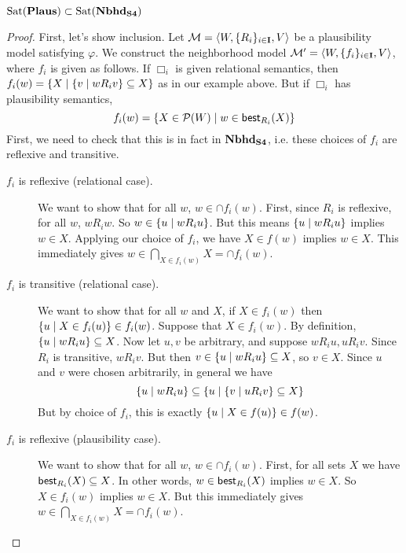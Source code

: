 \documentclass[letterpaper]{article}
\begin{document}

\begin{proposition}
    $\mathrm{Sat}( \textrm{\textbf{Plaus}} ) \subset \mathrm{Sat}( \textrm{\textbf{Nbhd}}_\textrm{\textbf{S4}} )$
\end{proposition}
\begin{proof}
    First, let's show inclusion.  Let $\mathcal{M} = \langle W, \{ R_i \}_{i \in \textbf{I}}, V \rangle$ be a plausibility model satisfying $\varphi$.  We construct the neighborhood model $\mathcal{M}' = \langle W, \{ f_i \}_{i \in \textbf{I}}, V \rangle$, where $f_i$ is given as follows.  If $\Box_i$ is given relational semantics, then $f_i(w) = \{ X \mid \{ v \mid w{R_i}v  \}\subseteq X \}$ as in our example above.  But if $\Box_i$ has plausibility semantics,
    \[
        f_i(w) = \{ X \in \mathcal{P}(W) \mid w \in \mathsf{best}_{R_i}(X) \}
    \]
    First, we need to check that this is in fact in $\textrm{\textbf{Nbhd}}_\textrm{\textbf{S4}}$, i.e. these choices of $f_i$ are reflexive and transitive.
    \begin{description}
        \item[$f_i$ is reflexive (relational case).]
        We want to show that for all $w$, $w \in \cap f_i(w)$.  First, since $R_i$ is reflexive, for all $w$, $w{R_i}w$.  So $w \in \{ u \mid w{R_i}u \}$.  But this means $\{ u \mid w{R_i}u \}$ implies $w \in X$.  Applying our choice of $f_i$, we have $X \in f(w)$ implies $w \in X$.  This immediately gives $w \in \bigcap_{X \in f_i(w)} X = \cap f_i(w)$.

        \item[$f_i$ is transitive (relational case).]
        We want to show that for all $w$ and $X$, if $X \in f_i(w)$ then $\{ u \mid X \in f_i(u) \} \in f_i(w)$.  Suppose that $X \in f_i(w)$.  By definition, $\{ u \mid w{R_i}u \} \subseteq X$.  Now let $u, v$ be arbitrary, and suppose $w{R_i}u, u{R_i}v$.  Since $R_i$ is transitive, $w{R_i}v$.  But then $v \in \{ u \mid w{R_i}u \} \subseteq X$, so $v \in X$.  Since $u$ and $v$ were chosen arbitrarily, in general we have
        \[
            \{ u \mid w{R_i}u \} \subseteq \{ u \mid \{ v \mid u{R_i}v \} \subseteq X \}
        \]
        But by choice of $f_i$, this is exactly $\{ u \mid X \in f(u) \} \in f(w)$.

        \item[$f_i$ is reflexive (plausibility case).]
        We want to show that for all $w$, $w \in \cap f_i(w)$.  First, for all sets $X$ we have $\mathsf{best}_{R_i}(X) \subseteq X$.  In other words, $w \in \mathsf{best}_{R_i}(X)$ implies $w \in X$.  So $X \in f_i(w)$ implies $w \in X$.  But this immediately gives $w \in \bigcap_{X \in f_i(w)} X = \cap f_i(w)$.


\end{description}
\end{proof}
\end{document}
